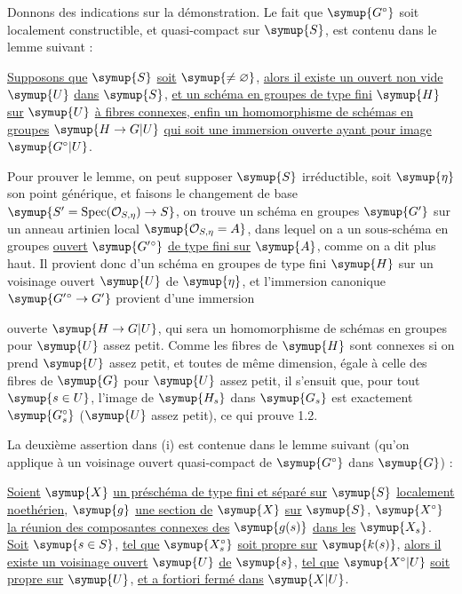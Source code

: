 Donnons des indications sur la démonstration. Le fait que $\symup{G^\circ}$ soit
localement constructible, et quasi-compact sur $\symup{S}$, est contenu dans le lemme
suivant :

 \uline{Supposons que} $\symup{S}$ \uline{soit} $\symup{\neq\varnothing}$, \uline{alors il existe un ouvert
non vide} $\symup{U}$ \uline{dans} $\symup{S}$, \uline{et un schéma en groupes de type fini} $\symup{H}$ \uline{sur} $\symup{U}$ \uline{à
fibres connexes, enfin un homomorphisme de schémas en groupes}
$\symup{H\to G|U}$ \uline{qui soit une immersion ouverte ayant pour image}
$\symup{G^\circ|U}$.

Pour prouver le lemme, on peut supposer $\symup{S}$ irréductible, soit $\symup{\eta}$ son point
générique, et faisons le changement de base
$\symup{S'=\operatorname{Spec}(\mathcal O_{S,\eta})\to S}$, on trouve un
schéma en groupes $\symup{G'}$ sur un anneau artinien local
$\symup{\mathcal O_{S,\eta}=A}$, dans lequel on a un sous-schéma en groupes \uline{ouvert}
$\symup{G'{}^\circ}$ \uline{de type fini sur} $\symup{A}$, comme on a dit plus haut. Il provient donc
d'un schéma en groupes de type fini $\symup{H}$ sur un voisinage ouvert $\symup{U}$ de $\symup{\eta}$,
et l'immersion canonique $\symup{G'{}^\circ\to G'}$ provient d'une
immersion

ouverte $\symup{H\to G|U}$, qui sera un homomorphisme de schémas en groupes
pour $\symup{U}$ assez petit. Comme les fibres de $\symup{H}$ sont connexes si on prend $\symup{U}$
assez petit, et toutes de même dimension, égale à celle des fibres de $\symup{G}$ pour
$\symup{U}$ assez petit, il s'ensuit que, pour tout $\symup{s\in U}$, l'image de $\symup{H_s}$ dans
$\symup{G_s}$ est exactement $\symup{G_s^\circ}$ ($\symup{U}$ assez petit), ce qui prouve 1.2.

La deuxième assertion dans (i) est contenue dans le lemme suivant (qu'on
applique à un voisinage ouvert quasi-compact de $\symup{G^\circ}$ dans $\symup{G}$) :

 \uline{Soient} $\symup{X}$ \uline{un préschéma de type fini et séparé sur} $\symup{S}$
\uline{localement noethérien}, $\symup{g}$ \uline{une section de} $\symup{X}$ \uline{sur} $\symup{S}$, $\symup{X^\circ}$ \uline{la réunion des
composantes connexes des} $\symup{g(s)}$ \uline{dans les} $\symup{X_s}$. \uline{Soit} $\symup{s\in S}$, \uline{tel que}
$\symup{X_s^\circ}$ \uline{soit propre sur} $\symup{k(s)}$, \uline{alors il existe un voisinage ouvert} $\symup{U}$ \uline{de}
$\symup{s}$, \uline{tel que} $\symup{X^\circ|U}$ \uline{soit propre sur} $\symup{U}$, \uline{et a fortiori fermé dans} $\symup{X|U}$.

